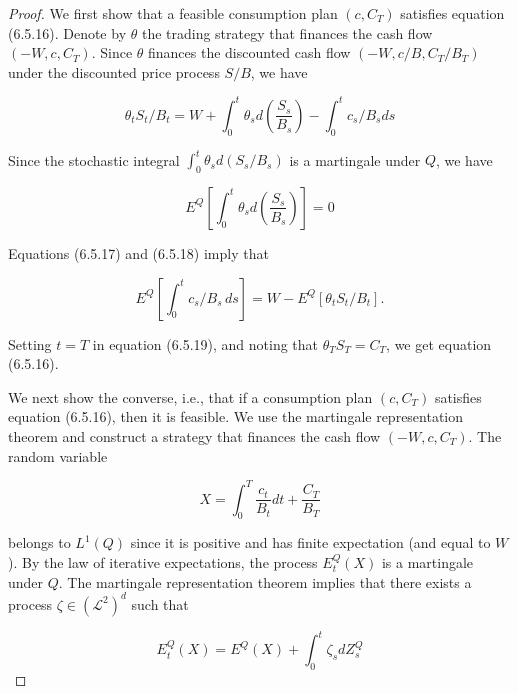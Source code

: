 \documentclass[\topdir/lecture\_notes.tex]{subfiles}
\begin{document}
\begin{proof}
We first show that a feasible consumption plan \(\left(c, C_{T}\right)\) satisfies equation (6.5.16). Denote by \(\theta\) the trading strategy that finances the cash flow \(\left(-W, c, C_{T}\right)\). Since \(\theta\) finances the discounted cash flow \(\left(-W, c / B, C_{T} / B_{T}\right)\) under the discounted price process \(S / B\), we have

\begin{equation}
\theta_{t} S_{t}/B_{t}=W+\int_{0}^{t} \theta_{s} d\left(\frac{S_{s}}{B_{s}}\right)-\int_{0}^{t} c_{s}/B_{s} d s \label{eq:6.5.17}
\end{equation}

Since the stochastic integral \(\int_{0}^{t} \theta_{s} d\left(S_{s} / B_{s}\right)\) is a martingale under \(Q\), we have

\begin{equation}
E^{Q}\left[\int_{0}^{t} \theta_{s} d\left(\frac{S_{s}}{B_{s}}\right)\right]=0 \label{eq:6.5.18}
\end{equation}

Equations (6.5.17) and (6.5.18) imply that

\begin{equation}
E^{Q}\!\left[\int_{0}^{t} c_{s}/B_{s} \, d s\right]=W-E^{Q}\!\left[\theta_{t} S_{t}/B_{t}\right]. \label{eq:6.5.19}
\end{equation}

Setting \(t=T\) in equation (6.5.19), and noting that \(\theta_{T} S_{T}=C_{T}\), we get equation (6.5.16).

We next show the converse, i.e., that if a consumption plan \(\left(c, C_{T}\right)\) satisfies equation (6.5.16), then it is feasible. We use the martingale representation theorem and construct a strategy that finances the cash flow \(\left(-W, c, C_{T}\right)\). The random variable

\begin{equation}
X=\int_{0}^{T} \frac{c_{t}}{B_{t}} d t+\frac{C_{T}}{B_{T}}
\end{equation}

belongs to \(L^{1}(Q)\) since it is positive and has finite expectation (and equal to \(W\) ). By the law of iterative expectations, the process \(E_{t}^{Q}(X)\) is a martingale under \(Q\). The martingale representation theorem implies that there exists a process \(\zeta \in\left(\mathcal{L}^{2}\right)^{d}\) such that

\begin{equation}
E_{t}^{Q}(X)=E^{Q}(X)+\int_{0}^{t} \zeta_{s} d Z_{s}^{Q} \label{eq:6.5.20}
\end{equation}


\end{proof}
\end{document}

